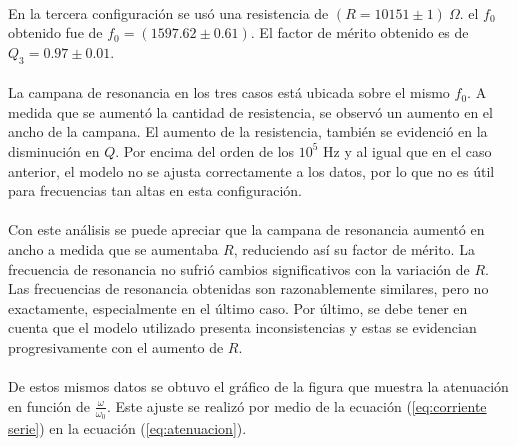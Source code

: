 \paragraph{}En la tercera configuración se usó una resistencia de $(R= 10151 \pm 1)\ \Omega$. el $f_0$ obtenido fue de $f_0 = (1597.62 \pm 0.61)$. El factor de mérito obtenido es de $Q_3 = 0.97 \pm 0.01$. 

\paragraph{} La campana de resonancia en los tres casos está ubicada sobre el mismo $f_0$. A medida que se aumentó la cantidad de resistencia, se observó un aumento en el ancho de la campana. El aumento de la resistencia, también se evidenció en la disminución en $Q$. Por encima del orden de los $10^5$ Hz y al igual que en el caso anterior, el modelo no se ajusta correctamente a los datos, por lo que no es útil para frecuencias tan altas en esta configuración. 

\paragraph{}Con este análisis se puede apreciar que la campana de resonancia aumentó en ancho a medida que se aumentaba $R$, reduciendo así su factor de mérito. La frecuencia de resonancia no sufrió cambios significativos con la variación de $R$. Las frecuencias de resonancia obtenidas son razonablemente similares, pero no exactamente, especialmente en el último caso. Por último, se debe tener en cuenta que el modelo utilizado presenta inconsistencias y estas se evidencian progresivamente con el aumento de $R$.





\paragraph{}
De estos mismos datos se obtuvo el gráfico de la figura que muestra la atenuación en función de $\frac{\omega}{\omega_0}$. Este ajuste se realizó por medio de la ecuación (\ref{eq:corriente serie}) en la ecuación (\ref{eq:atenuacion}).

